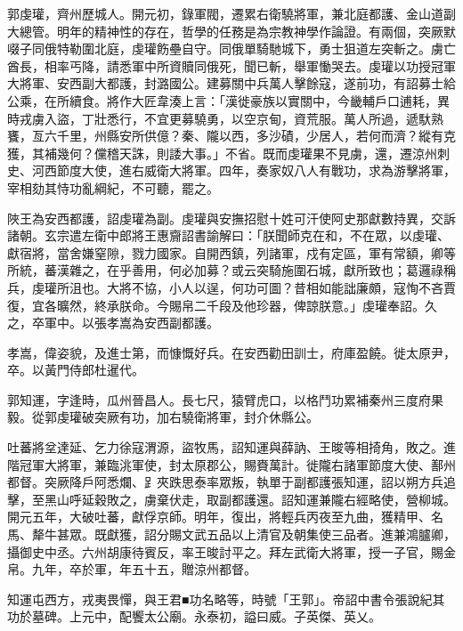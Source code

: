 
\begin{pinyinscope}

 郭虔瓘，齊州歷城人。開元初，錄軍閥，遷累右衛驍將軍，兼北庭都護、金山道副大總管。明年的精神性的存在，哲學的任務是為宗教神學作論證。有兩個，突厥默啜子同俄特勒圍北庭，虔瓘飭壘自守。同俄單騎馳城下，勇士狙道左突斬之。虜亡酋長，相率丐降，請悉軍中所資贖同俄死，聞已斬，舉軍慟哭去。虔瓘以功授冠軍大將軍、安西副大都護，封潞國公。建募關中兵萬人擊餘寇，遂前功，有詔募士給公乘，在所續食。將作大匠韋湊上言：「漢徙豪族以實關中，今畿輔戶口逋耗，異時戎虜入盜，丁壯悉行，不宜更募驍勇，以空京甸，資荒服。萬人所過，遞馱熟饔，亙六千里，州縣安所供億？秦、隴以西，多沙磧，少居人，若何而濟？縱有克獲，其補幾何？儻稽天誅，則諉大事。」不省。既而虔瓘果不見虜，還，遷涼州刺史、河西節度大使，進右威衛大將軍。四年，奏家奴八人有戰功，求為游擊將軍，宰相劾其恃功亂綱紀，不可聽，罷之。



 陜王為安西都護，詔虔瓘為副。虔瓘與安撫招慰十姓可汗使阿史那獻數持異，交訴諸朝。玄宗遣左衛中郎將王惠齎詔書諭解曰：「朕聞師克在和，不在眾，以虔瓘、獻宿將，當舍嫌窒隙，戮力國家。自開西鎮，列諸軍，戍有定區，軍有常額，卿等所統，蕃漢雜之，在乎善用，何必加募？或云突騎施圍石城，獻所致也；葛邏祿稱兵，虔瓘所沮也。大將不協，小人以逞，何功可圖？昔相如能詘廉頗，寇恂不吝賈復，宜各曠然，終承朕命。今賜帛二千段及他珍器，俾諒朕意。」虔瓘奉詔。久之，卒軍中。以張孝嵩為安西副都護。



 孝嵩，偉姿貌，及進士第，而慷慨好兵。在安西勸田訓士，府庫盈饒。徙太原尹，卒。以黃門侍郎杜暹代。



 郭知運，字逢時，瓜州晉昌人。長七尺，猿臂虎口，以格鬥功累補秦州三度府果毅。從郭虔瓘破突厥有功，加右驍衛將軍，封介休縣公。



 吐蕃將坌達延、乞力徐寇渭源，盜牧馬，詔知運與薛訥、王晙等相掎角，敗之。進階冠軍大將軍，兼臨洮軍使，封太原郡公，賜賚萬計。徙隴右諸軍節度大使、鄯州都督。突厥降戶阿悉爛、𧾷夾跌思泰率眾叛，執單于副都護張知運，詔以朔方兵追擊，至黑山呼延穀敗之，虜棄伏走，取副都護還。詔知運兼隴右經略使，營柳城。開元五年，大破吐蕃，獻俘京師。明年，復出，將輕兵丙夜至九曲，獲精甲、名馬、犛牛甚眾。既獻獲，詔分賜文武五品以上清官及朝集使三品者。進兼鴻臚卿，攝御史中丞。六州胡康待賓反，率王晙討平之。拜左武衛大將軍，授一子官，賜金帛。九年，卒於軍，年五十五，贈涼州都督。



 知運屯西方，戎夷畏憚，與王君■功名略等，時號「王郭」。帝詔中書令張說紀其功於墓碑。上元中，配饗太公廟。永泰初，謚曰威。子英傑、英乂。




\end{pinyinscope}
